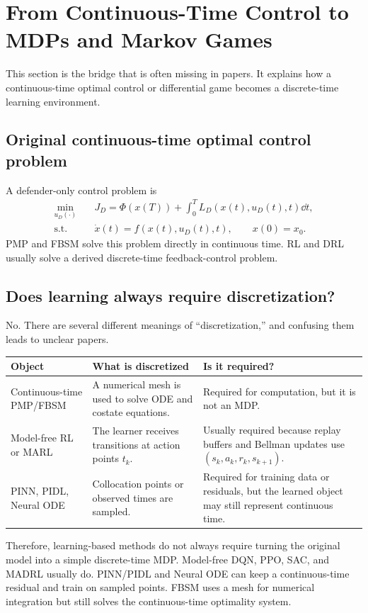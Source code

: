 \documentclass[11pt,a4paper]{article}
\begin{document}
\section{From Continuous-Time Control to MDPs and Markov Games}
This section is the bridge that is often missing in papers. It explains how a continuous-time optimal control or differential game becomes a discrete-time learning environment.

\subsection{Original continuous-time optimal control problem}
A defender-only control problem is
\begin{align}
\min_{u_D(\cdot)} \quad &J_D=\Phi(x(T))+\int_0^T L_D(x(t),u_D(t),t)\dd t, \\
\text{s.t.}\quad &\dot{x}(t)=f(x(t),u_D(t),t),\qquad x(0)=x_0.
\end{align}
PMP and FBSM solve this problem directly in continuous time. RL and DRL usually solve a derived discrete-time feedback-control problem.

\subsection{Does learning always require discretization?}
No. There are several different meanings of ``discretization,'' and confusing them leads to unclear papers.

\begin{longtable}{p{}p{}p{}}
\toprule
Object & What is discretized & Is it required? \\
\midrule
Continuous-time PMP/FBSM & A numerical mesh is used to solve ODE and costate equations. & Required for computation, but it is not an MDP. \\
Model-free RL or MARL & The learner receives transitions at action points $t_k$. & Usually required because replay buffers and Bellman updates use $(s_k,a_k,r_k,s_{k+1})$. \\
PINN, PIDL, Neural ODE & Collocation points or observed times are sampled. & Required for training data or residuals, but the learned object may still represent continuous time. \\
\bottomrule
\end{longtable}

Therefore, learning-based methods do not always require turning the original model into a simple discrete-time MDP. Model-free DQN, PPO, SAC, and MADRL usually do. PINN/PIDL and Neural ODE can keep a continuous-time residual and train on sampled points. FBSM uses a mesh for numerical integration but still solves the continuous-time optimality system.
\end{document}
